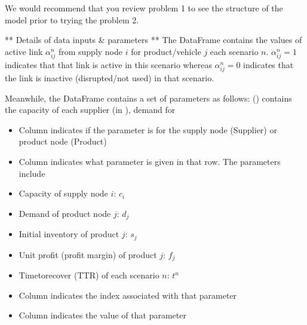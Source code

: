 \documentclass[letterpaper,10pt,english]{jupyterBook}
\begin{document}
\sphinxAtStartPar
We would recommend that you review problem 1 to see the structure of the model prior to trying the problem 2.

\sphinxAtStartPar
** Details of data inputs \& parameters **
The DataFrame  contains the values of active link \(\alpha_{ij}^n\) from supply node \(i\) for product/vehicle \(j\) each scenario \(n\). \(\alpha_{ij}^n = 1\) indicates that that link is active in this scenario whereas \(\alpha_{ij}^n=0\) indicates that the link is inactive (disrupted/not used) in that scenario.

\sphinxAtStartPar
Meanwhile, the DataFrame  contains a set of parameters as follows:
() contains the capacity of each supplier (in ), demand for
\begin{itemize}
\item {} 
\sphinxAtStartPar
Column  indicates if the parameter is for the supply node (Supplier) or product node (Product)

\item {} 
\sphinxAtStartPar
Column  indicates what parameter is given in that row. The parameters include

\end{itemize}
\begin{itemize}
\item {} 
\sphinxAtStartPar
Capacity of supply node \(i\): \(c_i\)

\item {} 
\sphinxAtStartPar
Demand of product node \(j\): \(d_j\)

\item {} 
\sphinxAtStartPar
Initial inventory of product \(j\): \(s_j\)

\item {} 
\sphinxAtStartPar
Unit profit (profit margin) of product \(j\): \(f_j\)

\item {} 
\sphinxAtStartPar
Time\sphinxhyphen{}to\sphinxhyphen{}recover (TTR) of each scenario \(n\): \(t^n\)

\end{itemize}
\begin{itemize}
\item {} 
\sphinxAtStartPar
Column  indicates the index associated with that parameter

\item {} 
\sphinxAtStartPar
Column  indicates the value of that parameter

\end{itemize}
\end{document}
